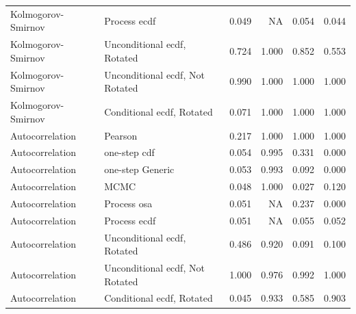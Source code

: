 \documentclass[
]{article}
\begin{document}
\begin{table}[H]
\begin{tabular}[t]{llrrrr}
Kolmogorov- Smirnov & Process ecdf & 0.049 & NA & 0.054 & 0.044\\
\addlinespace
Kolmogorov- Smirnov & Unconditional ecdf, Rotated & 0.724 & 1.000 & 0.852 & 0.553\\
Kolmogorov- Smirnov & Unconditional ecdf, Not Rotated & 0.990 & 1.000 & 1.000 & 1.000\\
Kolmogorov- Smirnov & Conditional ecdf, Rotated & 0.071 & 1.000 & 1.000 & 1.000\\
Autocorrelation & Pearson & 0.217 & 1.000 & 1.000 & 1.000\\
Autocorrelation & one-step cdf & 0.054 & 0.995 & 0.331 & 0.000\\
\addlinespace
Autocorrelation & one-step Generic & 0.053 & 0.993 & 0.092 & 0.000\\
Autocorrelation & MCMC & 0.048 & 1.000 & 0.027 & 0.120\\
Autocorrelation & Process osa & 0.051 & NA & 0.237 & 0.000\\
Autocorrelation & Process ecdf & 0.051 & NA & 0.055 & 0.052\\
Autocorrelation & Unconditional ecdf, Rotated & 0.486 & 0.920 & 0.091 & 0.100\\
\addlinespace
Autocorrelation & Unconditional ecdf, Not Rotated & 1.000 & 0.976 & 0.992 & 1.000\\
Autocorrelation & Conditional ecdf, Rotated & 0.045 & 0.933 & 0.585 & 0.903\\
\bottomrule
\end{tabular}
\end{table}
\end{document}
